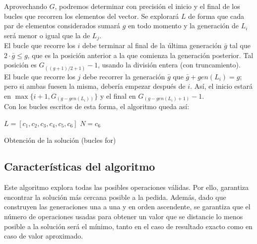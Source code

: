 Aprovechando $G$, podremos determinar con precisión el inicio y el final de los bucles que recorren los elementos del vector. Se explorará $L$ de forma que cada par de elementos considerados sumará $g$ en todo momento y la generación de $L_i$ será menor o igual que la de $L_j$.\\

El bucle que recorre los $i$ debe terminar al final de la última generación $\bar g$ tal que $2\cdot \bar g \le g$, que es la posición anterior a la que comienza la generación posterior. Tal posición es $G_{((g+1)/2+1)}-1$, usando la división entera (con truncamiento).\\

El bucle que recorre los $j$ debe recorrer la generación $\bar g$ que $\bar g + gen(L_i) = g$; pero si ambas fuesen la misma, debería empezar después de $i$. Así, el inicio estará en $\max \{i+1, G_{(g-gen(L_i))}\}$ y el final en $G_{(g-gen(L_i)+1)}-1$.\\

Con los bucles escritos de esta forma, el algoritmo queda así:

\begin{algorithm}[H]
	
	$L = [c_1, c_2, c_3, c_4, c_5, c_6]$\;
	$N = c_6$\;
	\caption{Obtención de la solución (bucles for)}
\end{algorithm}

\subsection{Características del algoritmo}
Este algoritmo explora todas las posibles operaciones válidas.
Por ello, garantiza encontrar la solución más cercana posible a la pedida.
Además, dado que construyen las generaciones una a una y en orden ascendente,
se garantiza que el número de operaciones usadas para obtener un valor que se
distancie lo menos posible a la solución será el mínimo, tanto en el caso de
resultado exacto como en caso de valor aproximado.\\

